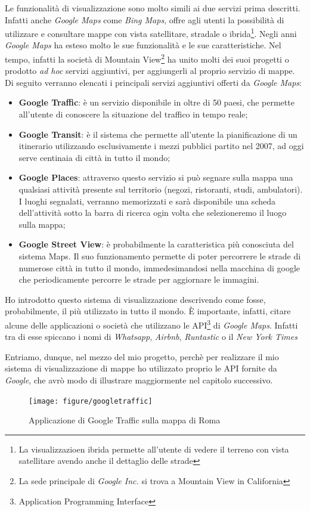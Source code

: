 Le funzionalità di visualizzazione sono molto simili ai due servizi prima descritti. Infatti anche \textit{Google Maps} come \textit{Bing Maps}, offre agli utenti la possibilità di utilizzare e consultare mappe con vista satellitare, stradale o ibrida\footnote{La visualizzazioen ibrida permette all'utente di vedere il terreno con vista satellitare avendo anche il dettaglio delle strade}. Negli anni \textit{Google Maps} ha esteso molto le sue funzionalità e le sue caratteristiche. Nel tempo, infatti la società di Mountain View\footnote{La sede principale di \textit{Google Inc.} si trova a Mountain View in California} ha unito molti dei suoi progetti o prodotto \textit{ad hoc} servizi aggiuntivi, per aggiungerli al proprio servizio di mappe. Di seguito verranno elencati i principali servizi aggiuntivi offerti da \textit{Google Maps}:

\begin{itemize}
	\item\textbf{Google Traffic}: è un servizio disponibile in oltre di 50 paesi, che permette all'utente di conoscere la situazione del traffico in tempo reale;
	\item\textbf{Google Transit}: è il sistema che permette all'utente la pianificazione di un itinerario utilizzando esclusivamente i mezzi pubblici partito nel 2007, ad oggi serve centinaia di città in tutto il mondo;
	\item\textbf{Google Places}: attraverso questo servizio si può segnare sulla mappa una qualsiasi attività presente sul territorio (negozi, ristoranti, studi, ambulatori). I luoghi segnalati, verranno memorizzati e sarà disponibile una scheda dell'attività sotto la barra di ricerca ogin volta che selezioneremo il luogo sulla mappa;
	\item\textbf{Google Street View}: è probabilmente la caratteristica più conosciuta del sistema Maps. Il suo funzionamento permette di poter percorrere le strade di numerose città in tutto il mondo, immedesimandosi nella macchina di google che periodicamente percorre le strade per aggiornare le immagini.
\end{itemize}
Ho introdotto questo sistema di visualizzazione descrivendo come fosse, probabilmente, il più utilizzato in tutto il mondo. È importante, infatti, citare alcune delle applicazioni o società che utilizzano le API\footnote{Application Programming Interface\cite{wiki:api}} di \textit{Google Maps}. Infatti tra di esse spiccano i nomi di \textit{Whatsapp}, \textit{Airbnb}, \textit{Runtastic} o il \textit{New York Times}\cite{gmaps:show}

Entriamo, dunque, nel mezzo del mio progetto, perchè per realizzare il mio sistema di visualizzazione di mappe ho utilizzato proprio le API fornite da \textit{Google}, che avrò modo di illustrare maggiormente nel capitolo successivo.

\begin{figure}[ht]
	\centering
	\texttt{[image: figure/googletraffic]}
	\caption{Applicazione di Google Traffic sulla mappa di Roma}\label{fig:googletraffic}
\end{figure}